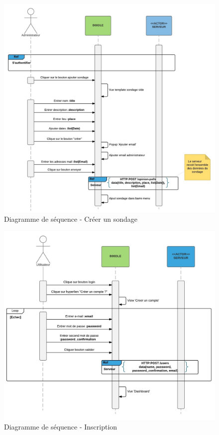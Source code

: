 \documentclass[titlepage]{report}
\begin{document}
\begin{figure}[h]
	\caption{Diagramme de séquence - Créer un sondage}
	\label{annexe_diagramme_sequence_creerSondage}
	\centering
	\includegraphics[width=\textwidth]{figures/diagrammes/sequence_creerSondage.png}
\end{figure}

\begin{figure}[h]
	\caption{Diagramme de séquence - Inscription}
	\label{annexe_diagramme_sequence_inscription}
	\centering
	\includegraphics[width=\textwidth]{figures/diagrammes/sequence_inscription.png}
\end{figure}
\end{document}

